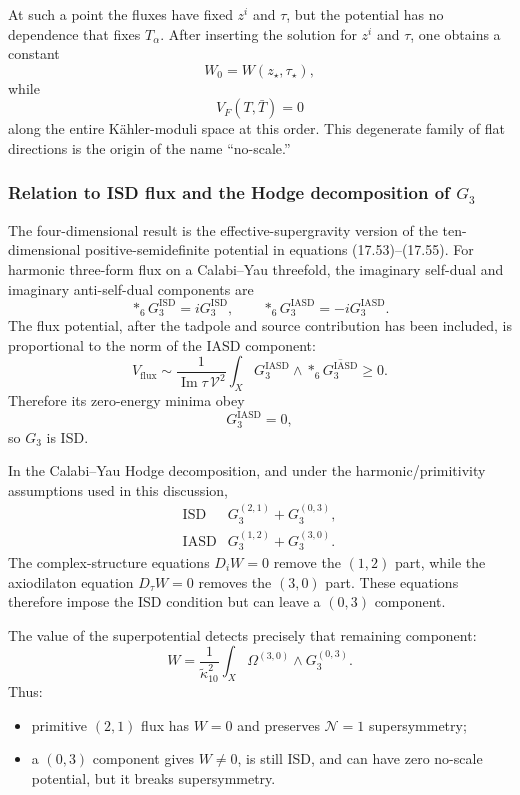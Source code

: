 \documentclass[
  10pt,
  a4paper,
  openany]{book}
\providecommand{\tightlist}{%
  \setlength{\itemsep}{0pt}\setlength{\parskip}{0pt}}
\begin{document}
At such a point the fluxes have fixed \(z^i\) and \(\tau\), but the
potential has no dependence that fixes \(T_\alpha\). After inserting the
solution for \(z^i\) and \(\tau\), one obtains a constant \[
W_0=W(z_\star,\tau_\star),
\] while \[
V_F(T,\bar T)=0
\] along the entire Kähler-moduli space at this order. This degenerate
family of flat directions is the origin of the name ``no-scale.''

\subsubsection{\texorpdfstring{Relation to ISD flux and the Hodge
decomposition of
\(G_3\)}{Relation to ISD flux and the Hodge decomposition of G\_3}}\label{relation-to-isd-flux-and-the-hodge-decomposition-of-g_3}

The four-dimensional result is the effective-supergravity version of the
ten-dimensional positive-semidefinite potential in equations
(17.53)--(17.55). For harmonic three-form flux on a Calabi--Yau
threefold, the imaginary self-dual and imaginary anti-self-dual
components are \[
*_6G_3^{\mathrm{ISD}}
=iG_3^{\mathrm{ISD}},
\qquad
*_6G_3^{\mathrm{IASD}}
=-iG_3^{\mathrm{IASD}}.
\] The flux potential, after the tadpole and source contribution has
been included, is proportional to the norm of the IASD component: \[
V_{\mathrm{flux}}
\sim
\frac{1}{\operatorname{Im}\tau\,\mathcal V^2}
\int_X
G_3^{\mathrm{IASD}}
\wedge *_6\overline{G_3^{\mathrm{IASD}}}
\geq0.
\] Therefore its zero-energy minima obey \[
G_3^{\mathrm{IASD}}=0,
\] so \(G_3\) is ISD.

In the Calabi--Yau Hodge decomposition, and under the
harmonic/primitivity assumptions used in this discussion, \[
\begin{array}{c|c}
\text{ISD} & G_3^{(2,1)}+G_3^{(0,3)},\\
\text{IASD} & G_3^{(1,2)}+G_3^{(3,0)}.
\end{array}
\] The complex-structure equations \(D_iW=0\) remove the \((1,2)\) part,
while the axiodilaton equation \(D_\tau W=0\) removes the \((3,0)\)
part. These equations therefore impose the ISD condition but can leave a
\((0,3)\) component.

The value of the superpotential detects precisely that remaining
component: \[
W
=\frac{1}{\tilde\kappa_{10}^2}
\int_X\Omega^{(3,0)}
\wedge G_3^{(0,3)}.
\] Thus:

\begin{itemize}
\tightlist
\item
  primitive \((2,1)\) flux has \(W=0\) and preserves \(\mathcal N=1\)
  supersymmetry;
\item
  a \((0,3)\) component gives \(W\neq0\), is still ISD, and can have
  zero no-scale potential, but it breaks supersymmetry.
\end{itemize}
\end{document}
